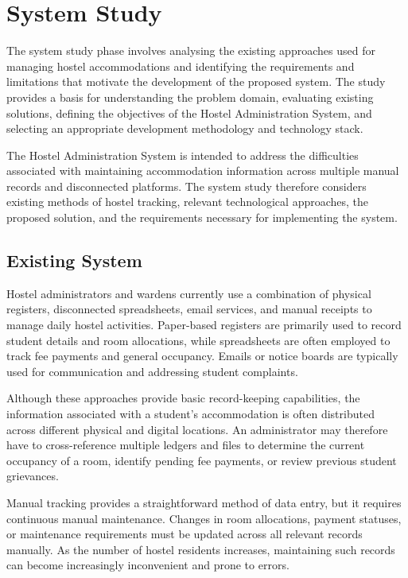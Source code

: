 \chapter{System Study}

The system study phase involves analysing the existing approaches used for managing hostel accommodations and identifying the requirements and limitations that motivate the development of the proposed system. The study provides a basis for understanding the problem domain, evaluating existing solutions, defining the objectives of the Hostel Administration System, and selecting an appropriate development methodology and technology stack.

The Hostel Administration System is intended to address the difficulties associated with maintaining accommodation information across multiple manual records and disconnected platforms. The system study therefore considers existing methods of hostel tracking, relevant technological approaches, the proposed solution, and the requirements necessary for implementing the system.

\section{Existing System}

Hostel administrators and wardens currently use a combination of physical registers, disconnected spreadsheets, email services, and manual receipts to manage daily hostel activities. Paper-based registers are primarily used to record student details and room allocations, while spreadsheets are often employed to track fee payments and general occupancy. Emails or notice boards are typically used for communication and addressing student complaints.

Although these approaches provide basic record-keeping capabilities, the information associated with a student's accommodation is often distributed across different physical and digital locations. An administrator may therefore have to cross-reference multiple ledgers and files to determine the current occupancy of a room, identify pending fee payments, or review previous student grievances.

Manual tracking provides a straightforward method of data entry, but it requires continuous manual maintenance. Changes in room allocations, payment statuses, or maintenance requirements must be updated across all relevant records manually. As the number of hostel residents increases, maintaining such records can become increasingly inconvenient and prone to errors.

